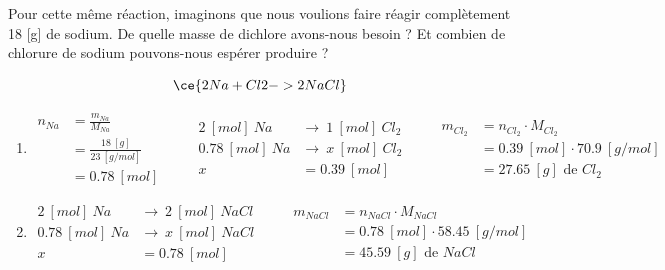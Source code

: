 \documentclass[
  11pt,
  a4paper,
  openany]{book}
\begin{document}
\begin{Exercise}

Pour cette même réaction, imaginons que nous voulions faire réagir complètement 18 {[}g{]} de sodium. De quelle masse de dichlore avons-nous besoin ? Et combien de chlorure de sodium pouvons-nous espérer produire ?


\end{Exercise}

\begin{Answer}

\[ \ce{2 Na + Cl2 -> 2 NaCl} \]

\begin{enumerate}
\def\labelenumi{\arabic{enumi}.}
\item
  \[ \begin{split}
    n_{Na} &= \frac{m_{Na}}{M_{Na}} \\
    &= \frac{18\ [g]}{23\ [g/mol]} \\
    &= 0.78\ [mol]
    \end{split}
    \qquad
    \begin{split}
    2\ [mol]\ Na &\rightarrow\ 1\ [mol]\ Cl_2 \\
    0.78\ [mol]\ Na &\rightarrow\ x\ [mol]\ Cl_2 \\
    x &= 0.39\ [mol]
    \end{split}
    \qquad
    \begin{split}
    m_{Cl_{2}} &= n_{Cl_{2}} \cdot M_{Cl_{2}} \\
    &= 0.39\ [mol] \cdot 70.9\ [g/mol] \\
    &= 27.65\ [g] \text{ de } Cl_2
    \end{split} \]
\item
  \[ \begin{split}
    2\ [mol]\ Na &\rightarrow\ 2\ [mol]\ NaCl \\
    0.78\ [mol]\ Na &\rightarrow\ x\ [mol]\ NaCl \\
    x &= 0.78\ [mol]
    \end{split}
    \qquad
    \begin{split}
    m_{NaCl} &= n_{NaCl} \cdot M_{NaCl} \\
    &= 0.78\ [mol] \cdot 58.45\ [g/mol] \\
    &= 45.59\ [g] \text{ de } NaCl
    \end{split} \]
\end{enumerate}

\end{Answer}
\end{document}
